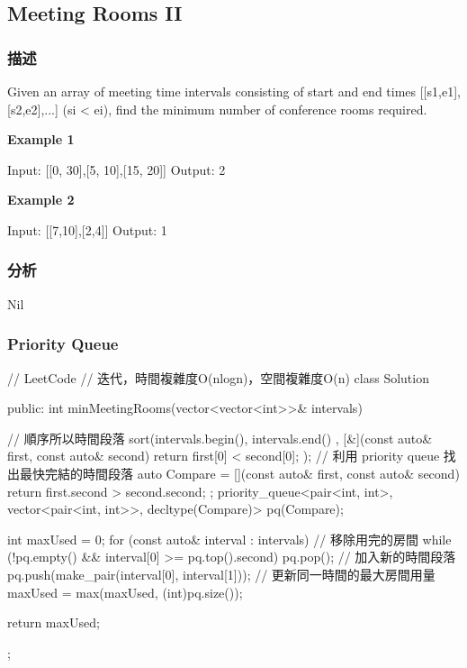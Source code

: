 \subsection{Meeting Rooms II} %
\label{sec:meeting-rooms-ii}


\subsubsection{描述}
Given an array of meeting time intervals consisting of start and end times [[s1,e1],[s2,e2],...] (si < ei), find the minimum number of conference rooms required.

\textbf{Example 1}
\begin{Code}
Input: [[0, 30],[5, 10],[15, 20]]
Output: 2
\end{Code}

\textbf{Example 2}
\begin{Code}
Input: [[7,10],[2,4]]
Output: 1
\end{Code}


\subsubsection{分析}
Nil

\subsubsection{Priority Queue}
\begin{Code}
// LeetCode
// 迭代，時間複雜度O(nlogn)，空間複雜度O(n)
class Solution {
public:
    int minMeetingRooms(vector<vector<int>>& intervals) {
        // 順序所以時間段落
        sort(intervals.begin(), intervals.end()
             , [&](const auto& first, const auto& second)
               {
                   return first[0] < second[0];
               });
        // 利用 priority queue 找出最快完結的時間段落
        auto Compare = [](const auto& first, const auto& second)
                          { return first.second > second.second; };
        priority_queue<pair<int, int>, vector<pair<int, int>>, decltype(Compare)>
                          pq(Compare);

        int maxUsed = 0;
        for (const auto& interval : intervals)
        {
            // 移除用完的房間
            while (!pq.empty() && interval[0] >= pq.top().second)
                pq.pop();
            // 加入新的時間段落
            pq.push(make_pair(interval[0], interval[1]));
            // 更新同一時間的最大房間用量
            maxUsed = max(maxUsed, (int)pq.size());
        }

        return maxUsed;
    }
};
\end{Code}

